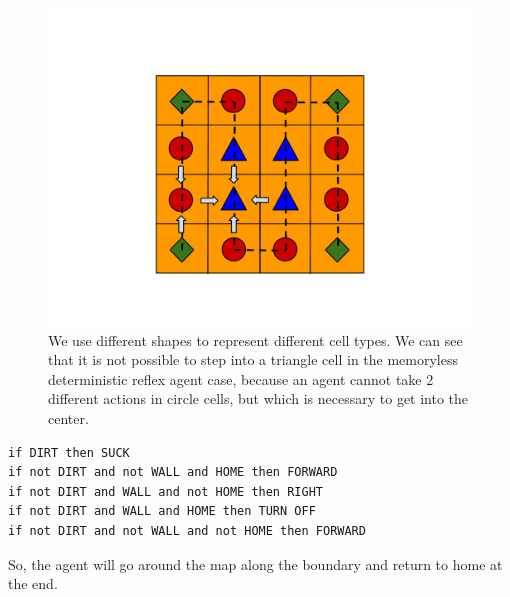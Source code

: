 \begin{figure}[!t]
\centering
\includegraphics[scale=.35]{img/celltype.pdf}
\caption{We use different shapes to represent different cell types. We can see that it is not possible to step into a triangle cell in the memoryless deterministic reflex agent case, because an agent cannot take 2 different actions in circle cells, but which is necessary to get into the center.}
\label{fig:celltypes}
\end{figure}

\begin{verbatim}
if DIRT then SUCK 
if not DIRT and not WALL and HOME then FORWARD
if not DIRT and WALL and not HOME then RIGHT
if not DIRT and WALL and HOME then TURN OFF
if not DIRT and not WALL and not HOME then FORWARD
\end{verbatim}

So, the agent will go around the map along the boundary and return to home at the end.

